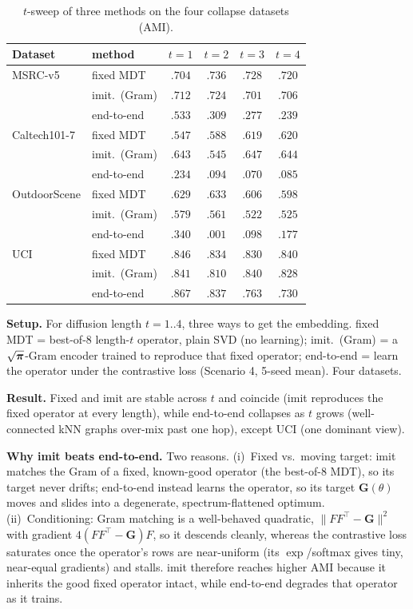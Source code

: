\begin{table}[H]\centering\footnotesize
\caption{$t$-sweep of three methods on the four collapse datasets (AMI).}
\label{tab:collapse-fair}
\setlength{\tabcolsep}{6pt}
\begin{tabular}{@{}ll cccc@{}}
\toprule
Dataset & method & $t{=}1$ & $t{=}2$ & $t{=}3$ & $t{=}4$\\
\midrule
MSRC-v5      & fixed MDT      & $.704$ & $.736$ & $.728$ & $.720$\\
             & imit.\ (Gram)  & $.712$ & $.724$ & $.701$ & $.706$\\
             & end-to-end     & $.533$ & $.309$ & $.277$ & $.239$\\
\midrule
Caltech101-7 & fixed MDT      & $.547$ & $.588$ & $.619$ & $.620$\\
             & imit.\ (Gram)  & $.643$ & $.545$ & $.647$ & $.644$\\
             & end-to-end     & $.234$ & $.094$ & $.070$ & $.085$\\
\midrule
OutdoorScene & fixed MDT      & $.629$ & $.633$ & $.606$ & $.598$\\
             & imit.\ (Gram)  & $.579$ & $.561$ & $.522$ & $.525$\\
             & end-to-end     & $.340$ & $.001$ & $.098$ & $.177$\\
\midrule
UCI          & fixed MDT      & $.846$ & $.834$ & $.830$ & $.840$\\
             & imit.\ (Gram)  & $.841$ & $.810$ & $.840$ & $.828$\\
             & end-to-end     & $.867$ & $.837$ & $.763$ & $.730$\\
\bottomrule
\end{tabular}
\end{table}

\noindent\textbf{Setup.} For diffusion length $t{=}1..4$, three ways to get the embedding.
fixed MDT = best-of-8 length-$t$ operator, plain SVD (no learning); imit.\ (Gram) = a
$\sqrt{\boldsymbol{\pi}}$-Gram encoder trained to reproduce that fixed operator; end-to-end = learn the
operator under the contrastive loss (Scenario 4, 5-seed mean). Four datasets.

\noindent\textbf{Result.} Fixed and imit are stable across $t$ and coincide (imit reproduces the fixed
operator at every length), while end-to-end collapses as $t$ grows (well-connected kNN graphs over-mix
past one hop), except UCI (one dominant view).

\noindent\textbf{Why imit beats end-to-end.} Two reasons. (i)~Fixed vs.\ moving target: imit
matches the Gram of a fixed, known-good operator (the best-of-8 MDT), so its target never drifts;
end-to-end instead learns the operator, so its target $\mathbf G(\theta)$ moves and slides into a
degenerate, spectrum-flattened optimum. (ii)~Conditioning: Gram matching is a well-behaved
quadratic, $\lVert FF^\top-\mathbf G\rVert^2$ with gradient $4(FF^\top-\mathbf G)F$, so it descends
cleanly, whereas the contrastive loss saturates once the operator's rows are near-uniform (its
$\exp$/softmax gives tiny, near-equal gradients) and stalls. imit therefore reaches higher AMI
because it inherits the good fixed operator intact, while end-to-end degrades that operator as it
trains.
